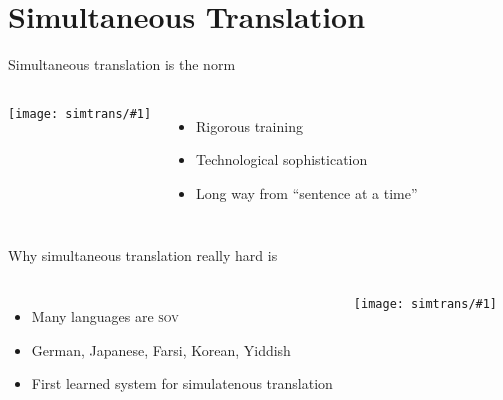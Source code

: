 \documentclass[compress]{beamer}
\newcommand{\gfxs}[2]{
\begin{center}
	\texttt{[image: simtrans/\#1]}
\end{center}
}
\begin{document}
\section{Simultaneous Translation}

\begin{frame}{Simultaneous translation is the norm}

  \begin{columns}
       \gfxs{nuremberg_translators}{.9}
       \begin{itemize}
         \item Rigorous training
         \item Technological sophistication
         \item Long way from ``sentence at a time''
       \end{itemize}
  \end{columns}

\end{frame}

\begin{frame}{Why simultaneous translation really hard is}

  \begin{columns}
      \begin{itemize}
        \item Many languages are \textsc{sov}
        \item \alert<2>{German}, Japanese, Farsi, Korean,
          \alert<3>{Yiddish}
        \item<4-> First learned system for simulatenous translation
      \end{itemize}
      \gfxs{yoda}{.6}
  \end{columns}

  \centering


\end{frame}
\end{document}
